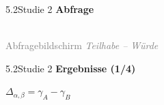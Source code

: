\documentclass[xcolor=table,9pt,aspectratio=169]{beamer}
\begin{document}
\begin{frame}{\vspace*{10mm}5.2\hspace*{1em}Studie 2}
\textbf{Abfrage}\\
\medskip
\begin{center}
   \\
   \textcolor{gray}{Abfragebildschirm \textit{Teilhabe -- Würde}}
\end{center}
\end{frame}


\begin{frame}{\vspace*{10mm}5.2\hspace*{1em}Studie 2}
\textbf{Ergebnisse (1/4)}\\
\medskip
\begin{center}
   $\Delta_{\alpha,\beta}=\gamma_{A}-\gamma_{B}$
\end{center}
\end{frame}
\end{document}
